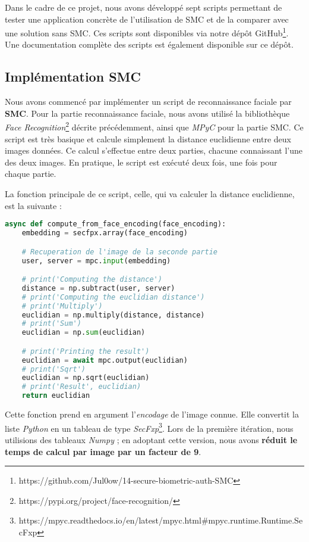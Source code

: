 \documentclass[12pt,a4paper]{article}
\begin{document}

Dans le cadre de ce projet, nous avons développé sept scripts permettant de tester une application concrète de l'utilisation de SMC et de la comparer avec une solution sans SMC. Ces scripts sont disponibles via notre dépôt GitHub\footnote{https://github.com/Jul0ow/14-secure-biometric-auth-SMC}. Une documentation complète des scripts est également disponible sur ce dépôt.


\subsection{Implémentation SMC}
Nous avons commencé par implémenter un script de reconnaissance faciale par \textbf{SMC}. Pour la partie reconnaissance faciale, nous avons utilisé la bibliothèque \textit{Face Recognition}\footnote{https://pypi.org/project/face-recognition/} décrite précédemment, ainsi que \textit{MPyC} pour la partie SMC. Ce script est très basique et calcule simplement la distance euclidienne entre deux images données. Ce calcul s'effectue entre deux parties, chacune connaissant l'une des deux images. En pratique, le script est exécuté deux fois, une fois pour chaque partie.

La fonction principale de ce script, celle, qui va calculer la distance euclidienne, est la suivante :
\begin{lstlisting}[language=Python]
async def compute_from_face_encoding(face_encoding):
    embedding = secfpx.array(face_encoding)

    # Recuperation de l'image de la seconde partie
    user, server = mpc.input(embedding)

    # print('Computing the distance')
    distance = np.subtract(user, server)
    # print('Computing the euclidian distance')
    # print('Multiply')
    euclidian = np.multiply(distance, distance)
    # print('Sum')
    euclidian = np.sum(euclidian)

    # print('Printing the result')
    euclidian = await mpc.output(euclidian)
    # print('Sqrt')
    euclidian = np.sqrt(euclidian)
    # print('Result', euclidian)
    return euclidian
\end{lstlisting}

Cette fonction prend en argument l'\textit{encodage} de l'image connue. Elle convertit la liste \textit{Python} en un tableau de type \textit{SecFxp}\footnote{https://mpyc.readthedocs.io/en/latest/mpyc.html\#mpyc.runtime.Runtime.SecFxp}. Lors de la première itération, nous utilisions des tableaux \textit{Numpy} ; en adoptant cette version, nous avons \textbf{réduit le temps de calcul par image par un facteur de 9}.
\end{document}
